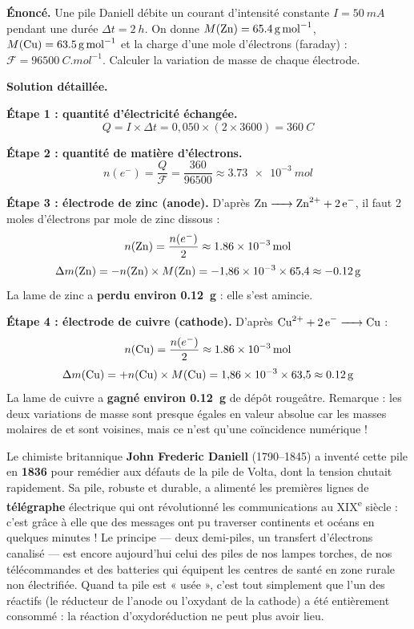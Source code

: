 \documentclass[11pt]{article}
\begin{document}
\begin{exoresolu}
\textbf{Énoncé.} Une pile Daniell débite un courant d'intensité constante $I = \SI{50}{mA}$ pendant une durée $\Delta t = \SI{2}{h}$. On donne $M(\ce{Zn}) = \SI{65,4}{g.mol^{-1}}$, $M(\ce{Cu}) = \SI{63,5}{g.mol^{-1}}$ et la charge d'une mole d'électrons (faraday) : $\mathcal{F} = \SI{96500}{C.mol^{-1}}$. Calculer la variation de masse de chaque électrode.

\tcblower
\textbf{Solution détaillée.}

\textbf{Étape 1 : quantité d'électricité échangée.}
\[ Q = I \times \Delta t = 0{,}050 \times (2 \times 3600) = \SI{360}{C} \]

\textbf{Étape 2 : quantité de matière d'électrons.}
\[ n(e^-) = \frac{Q}{\mathcal{F}} = \frac{360}{96500} \approx \SI{3,73e-3}{mol} \]

\textbf{Étape 3 : électrode de zinc (anode).} D'après $\ce{Zn -> Zn^2+ + 2e-}$, il faut 2 moles d'électrons par mole de zinc dissous :
\[ n(\ce{Zn}) = \frac{n(e^-)}{2} \approx \SI{1,86e-3}{mol} \]
\[ \Delta m(\ce{Zn}) = -n(\ce{Zn}) \times M(\ce{Zn}) = -1{,}86\times 10^{-3} \times 65{,}4 \approx \SI{-0,12}{g} \]
La lame de zinc a \textbf{perdu environ \SI{0,12}{g}} : elle s'est amincie.

\textbf{Étape 4 : électrode de cuivre (cathode).} D'après $\ce{Cu^2+ + 2e- -> Cu}$ :
\[ n(\ce{Cu}) = \frac{n(e^-)}{2} \approx \SI{1,86e-3}{mol} \]
\[ \Delta m(\ce{Cu}) = +n(\ce{Cu}) \times M(\ce{Cu}) = 1{,}86\times 10^{-3} \times 63{,}5 \approx \SI{+0,12}{g} \]
La lame de cuivre a \textbf{gagné environ \SI{0,12}{g}} de dépôt rougeâtre. Remarque : les deux variations de masse sont presque égales en valeur absolue car les masses molaires de  et  sont voisines, mais ce n'est qu'une coïncidence numérique !
\end{exoresolu}

\begin{savaistu}
Le chimiste britannique \textbf{John Frederic Daniell} (1790--1845) a inventé cette pile en \textbf{1836} pour remédier aux défauts de la pile de Volta, dont la tension chutait rapidement. Sa pile, robuste et durable, a alimenté les premières lignes de \textbf{télégraphe} électrique qui ont révolutionné les communications au XIX\textsuperscript{e} siècle : c'est grâce à elle que des messages ont pu traverser continents et océans en quelques minutes ! Le principe — deux demi-piles, un transfert d'électrons canalisé — est encore aujourd'hui celui des piles de nos lampes torches, de nos télécommandes et des batteries qui équipent les centres de santé en zone rurale non électrifiée. Quand ta pile est « usée », c'est tout simplement que l'un des réactifs (le réducteur de l'anode ou l'oxydant de la cathode) a été entièrement consommé : la réaction d'oxydoréduction ne peut plus avoir lieu.
\end{savaistu}
\end{document}
